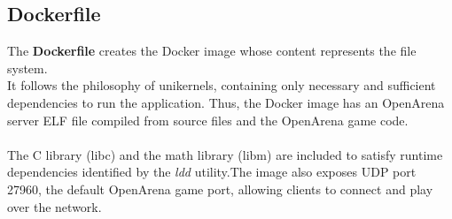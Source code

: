 \subsection{Dockerfile}
The \textbf{Dockerfile}\cite{dockerfile-reference} creates the Docker image whose content represents the file system. \\
It follows the philosophy of unikernels, containing only necessary and sufficient dependencies to run the application.
Thus, the Docker image has an OpenArena server ELF file compiled from source files and the OpenArena game code. \\ \\
The C library (libc) and the math library (libm) are included to satisfy runtime dependencies identified by the \textit{ldd}\cite{ldd-manpage} utility.\@ The image also exposes UDP port 27960, the default OpenArena game port, allowing clients to connect and play over the network.
